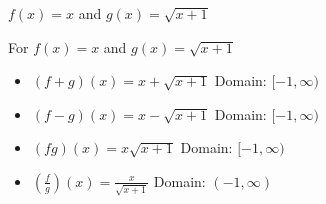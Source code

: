 {$f(x) = x$ and $g(x) = \sqrt{x+1}$}
{For   $f(x) =x$ and $g(x) = \sqrt{x+1}$

\begin{itemize}

\item $(f+g)(x) = x+\sqrt{x+1}$
      Domain: $[-1,\infty)$
\item $(f-g)(x) = x-\sqrt{x+1}$
       Domain: $[-1,\infty)$
\item $(fg)(x) = x\sqrt{x+1}$
       Domain: $[-1,\infty)$
\item $\left(\frac{f}{g}\right)(x) =\frac{x}{\sqrt{x+1}}$ 
       Domain: $(-1,\infty)$
\end{itemize}
}